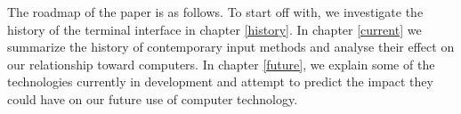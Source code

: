 
The roadmap of the paper is as follows. To start off with, we investigate the history of the terminal interface in chapter \ref{history}. In chapter \ref{current} we summarize the history of contemporary input methods and analyse their effect on our relationship toward computers. In chapter \ref{future}, we explain some of the technologies currently in development and attempt to predict the impact they could have on our future use of computer technology.
